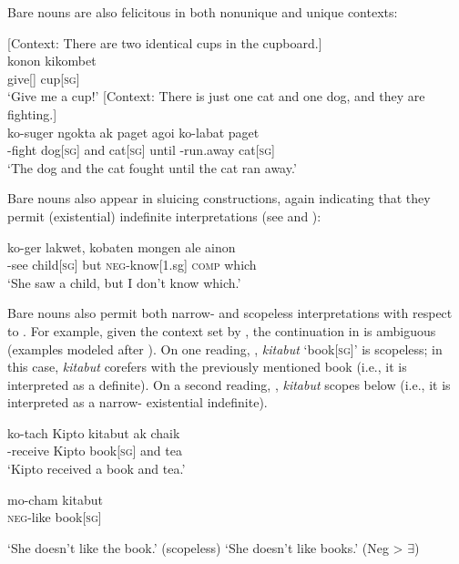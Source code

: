 \documentclass[output=paper]{LSP/langsci}
\begin{document}
\noindent Bare nouns are also felicitous in both nonunique and unique contexts:

\ea \label{ex:landman:uniqueness}
\settowidth{}  
  \ea \label{ex:landman:nonunique} [Context: There are two identical cups in the cupboard.]\\
    \gll konon kikombet \\
         give[\imp] cup[\textsc{sg}] \\ 
    \glt ‘Give me a cup!’
    \ex \label{ex:landman:unique} [Context: There is just one cat and one dog, and they are fighting.]\\ 
    \gll 
      ko-suger ngokta ak paget agoi ko-labat paget\\
      \pst-fight dog[\textsc{sg}] and cat[\textsc{sg}] until \pst-run.away cat[\textsc{sg}]\\ 
    \glt ‘The dog and the cat fought until the cat ran away.’
  \z
\z 

Bare nouns also appear in sluicing constructions, again indicating that they permit (existential) indefinite interpretations (see \citealt{Chung:1995} and \citealt{Reinhart:1997}):

\ea \label{ex:landman:sluicing}
  \gll ko-ger lakwet, kobaten mongen ale ainon\\	
	   \pst-see child[\textsc{sg}] but \textsc{neg}-know[1.sg] \textsc{comp} which\\
  \glt ‘She saw a child, but I don't know which.’
\z 

Bare nouns also permit both narrow- and scopeless interpretations with respect to . For example, given the context set by , the continuation in  is ambiguous (examples modeled after \citealt{Matthewson:2001}). On one reading, , \textit{kitabut} ‘book[\textsc{sg}]’ is scopeless; in this case, \textit{kitabut} corefers with the previously mentioned book (i.e., it is interpreted as a definite). On a second reading, , \textit{kitabut} scopes below  (i.e., it is interpreted as a narrow- existential indefinite). 

\ea \label{ex:landman:context}
  \gll ko-tach Kipto kitabut ak chaik\\	
	   \pst-receive Kipto book[\textsc{sg}] and tea\\
\glt ‘Kipto received a book and tea.’
\z 
   
\begin{exe}
\ex \label{ex:landman:barenounambig}
  \gll mo-cham kitabut\\	
       \textsc{neg}-like book[\textsc{sg}]\\
  \begin{xlist}
  \ex \label{ex:landman:scopeless} ‘She doesn't like the book.’  (scopeless)
  \ex \label{ex:landman:negexis} ‘She doesn't like books.’ (Neg > $\exists$)
  \end{xlist}   
\end{exe}
\end{document}
